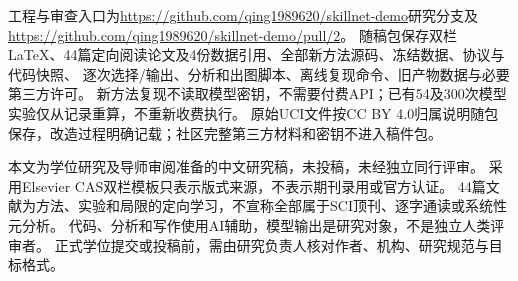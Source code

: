 工程与审查入口为\url{https://github.com/qing1989620/skillnet-demo}研究分支及
\url{https://github.com/qing1989620/skillnet-demo/pull/2}。
随稿包保存双栏LaTeX、44篇定向阅读论文及4份数据引用、全部新方法源码、冻结数据、协议与代码快照、
逐次选择/输出、分析和出图脚本、离线复现命令、旧产物数据与必要第三方许可。
新方法复现不读取模型密钥，不需要付费API；已有54及300次模型实验仅从记录重算，不重新收费执行。
原始UCI文件按CC BY 4.0归属说明随包保存，改造过程明确记载；社区完整第三方材料和密钥不进入稿件包。

本文为学位研究及导师审阅准备的中文研究稿，未投稿，未经独立同行评审。
采用Elsevier CAS双栏模板只表示版式来源，不表示期刊录用或官方认证。
44篇文献为方法、实验和局限的定向学习，不宣称全部属于SCI顶刊、逐字通读或系统性元分析。
代码、分析和写作使用AI辅助，模型输出是研究对象，不是独立人类评审者。
正式学位提交或投稿前，需由研究负责人核对作者、机构、研究规范与目标格式。
